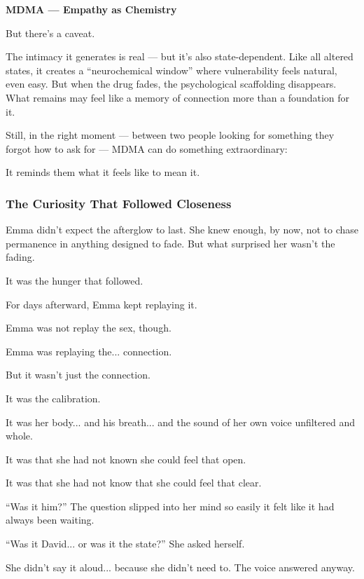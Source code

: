 \begin{TechnicalSidebar}{\textbf{MDMA — Empathy as Chemistry}}
  \medskip
  
  But there’s a caveat.

  \medskip
  
  The intimacy it generates is real — but it’s also state-dependent. Like all altered states, it 
  creates a “neurochemical window” where vulnerability feels natural, even easy. But when the drug 
  fades, the psychological scaffolding disappears. What remains may feel like a memory of connection 
  more than a foundation for it.
  
  \medskip
  
  Still, in the right moment — between two people looking for something they forgot how to ask for — 
  MDMA can do something extraordinary:
  
  \medskip
  
  It reminds them what it feels like to mean it.
  
\end{TechnicalSidebar}


\subsubsection{The Curiosity That Followed Closeness}

Emma didn’t expect the afterglow to last. She knew enough, by now, not to chase permanence in anything 
designed to fade. But what surprised her wasn’t the fading.

It was the hunger that followed.

For days afterward, Emma kept replaying it.  

Emma was not replay the sex, though. 

Emma was replaying the... connection.

But it wasn’t just the connection. 

It was the calibration. 

It was her body... and his breath... and the sound of her own voice unfiltered and whole. 

It was that she had not known she could feel that open. 

It was that she had not know that she could feel that clear.

``Was it him?'' The question slipped into her mind so easily it felt like it had always been waiting. 

``Was it David... or was it the state?'' She asked herself. 

She didn’t say it aloud... because she didn’t need to. The voice answered anyway.

